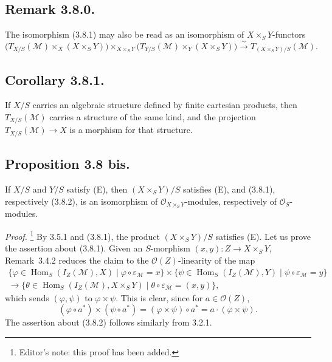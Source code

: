 \subsection*{Remark 3.8.0.}
The isomorphism (3.8.1) may also be read as an isomorphism of
\(X\times_SY\)-functors
\[
  \bigl(T_{X/S}(\mathcal M)\times_X(X\times_SY)\bigr)
  \mathop{\times}_{X\times_SY}
  \bigl(T_{Y/S}(\mathcal M)\times_Y(X\times_SY)\bigr)
  \xrightarrow{\sim}T_{(X\times_SY)/S}(\mathcal M).
\]

\subsection*{Corollary 3.8.1.}
If \(X/S\) carries an algebraic structure defined by finite cartesian
products, then \(T_{X/S}(\mathcal M)\) carries a structure of the same
kind, and the projection \(T_{X/S}(\mathcal M)\to X\) is a morphism for
that structure.

\subsection*{Proposition 3.8 bis.}
If \(X/S\) and \(Y/S\) satisfy (E), then \((X\times_SY)/S\) satisfies
(E), and (3.8.1), respectively (3.8.2), is an isomorphism of
\(\mathcal O_{X\times_SY}\)-modules, respectively of
\(\mathcal O_S\)-modules.

\emph{Proof.}
\footnote{Editor's note: this proof has been added.}
By 3.5.1 and (3.8.1), the product \((X\times_SY)/S\) satisfies (E). Let
us prove the assertion about (3.8.1). Given an \(S\)-morphism
\((x,y):Z\to X\times_SY\), Remark~3.4.2 reduces the claim to the
\(\mathcal O(Z)\)-linearity of the map
\begin{multline*}
  \{\varphi\in\operatorname{Hom}_S(I_Z(\mathcal M),X)
       \mid\varphi\circ\varepsilon_{\mathcal M}=x\}
  \times
  \{\psi\in\operatorname{Hom}_S(I_Z(\mathcal M),Y)
       \mid\psi\circ\varepsilon_{\mathcal M}=y\}\\
  \longrightarrow
  \{\theta\in\operatorname{Hom}_S(I_Z(\mathcal M),X\times_SY)
       \mid\theta\circ\varepsilon_{\mathcal M}=(x,y)\},
\end{multline*}
which sends \((\varphi,\psi)\) to \(\varphi\times\psi\). This is clear,
since for \(a\in\mathcal O(Z)\),
\[
  (\varphi\circ a^*)\times(\psi\circ a^*)
  =(\varphi\times\psi)\circ a^*
  =a\cdot(\varphi\times\psi).
\]
The assertion about (3.8.2) follows similarly from 3.2.1.

